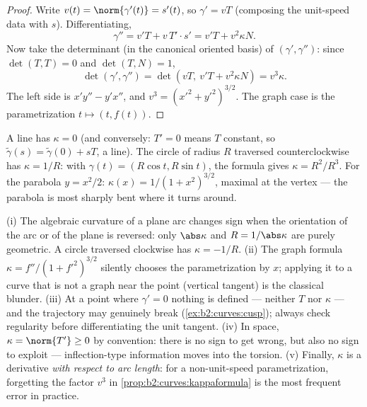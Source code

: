 \begin{proof}
Write $v(t) = \norm{\gamma'(t)} = s'(t)$, so $\gamma' = vT$
(composing the unit-speed data with $s$). Differentiating,
\[
\gamma'' = v'T + v\,T'\cdot s' = v'T + v^2\kappa N .
\]
Now take the determinant (in the canonical oriented basis) of
$(\gamma', \gamma'')$: since $\det(T, T) = 0$ and $\det(T, N) = 1$,
\[
\det(\gamma', \gamma'') = \det(vT,\ v'T + v^2\kappa N)
= v^3\kappa .
\]
The left side is $x'y'' - y'x''$, and $v^3 = (x'^2 +
y'^2)^{3/2}$. The graph case is the parametrization $t \mapsto (t,
f(t))$.
\end{proof}

\begin{example}\label{ex:b2:curves:kappaexamples}
A line has $\kappa = 0$ (and conversely: $T' = 0$ means $T$
constant, so $\tilde\gamma(s) = \tilde\gamma(0) + sT$, a line). The
circle of radius $R$ traversed counterclockwise has $\kappa = 1/R$:
with $\gamma(t) = (R\cos t, R\sin t)$, the formula gives $\kappa =
R^2/R^3$. For the parabola $y = x^2/2$: $\kappa(x) = 1/(1 +
x^2)^{3/2}$, maximal at the vertex --- the parabola is most sharply
bent where it turns around.
\end{example}

\begin{remark}
(i) The algebraic curvature of a plane arc changes sign when
the orientation of the arc or of the plane is reversed: only
$\abs\kappa$ and $R = 1/\abs\kappa$ are purely geometric. A
circle traversed clockwise has $\kappa = -1/R$. (ii) The
graph formula $\kappa = f''/(1 + f'^2)^{3/2}$ silently
chooses the parametrization by $x$; applying it to a curve
that is not a graph near the point (vertical tangent) is the
classical blunder. (iii) At a point where $\gamma' = 0$
nothing is defined --- neither $T$ nor $\kappa$ --- and the
trajectory may genuinely break
(\cref{ex:b2:curves:cusp}); always check regularity before
differentiating the unit tangent. (iv) In space, $\kappa =
\norm{T'} \geq 0$ by convention: there is no sign to get
wrong, but also no sign to exploit --- inflection-type
information moves into the torsion. (v) Finally, $\kappa$ is
a derivative \emph{with respect to arc length}: for a
non-unit-speed parametrization, forgetting the factor $v^3$
in \cref{prop:b2:curves:kappaformula} is the most frequent
error in practice.
\end{remark}

